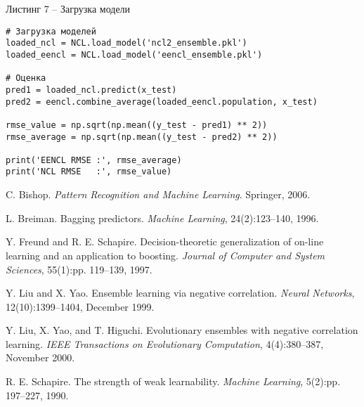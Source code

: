 \documentclass[12pt]{extarticle}
\begin{document}
\newpage

Листинг 7 -- Загрузка модели

\begin{lstlisting}
# Загрузка моделей
loaded_ncl = NCL.load_model('ncl2_ensemble.pkl')
loaded_eencl = NCL.load_model('eencl_ensemble.pkl')

# Оценка
pred1 = loaded_ncl.predict(x_test)
pred2 = eencl.combine_average(loaded_eencl.population, x_test)

rmse_value = np.sqrt(np.mean((y_test - pred1) ** 2))
rmse_average = np.sqrt(np.mean((y_test - pred2) ** 2))

print('EENCL RMSE :', rmse_average)
print('NCL RMSE   :', rmse_value)
\end{lstlisting}

\newpage %

\begin{thebibliography}{9}
C. Bishop. \textit{Pattern Recognition and Machine Learning}. Springer, 2006.

L. Breiman. Bagging predictors. \textit{Machine Learning}, 24(2):123–140, 1996.

Y. Freund and R. E. Schapire. Decision-theoretic generalization of on-line learning and an application to boosting. \textit{Journal of Computer and System Sciences}, 55(1):pp. 119–139, 1997.

Y. Liu and X. Yao. Ensemble learning via negative correlation. \textit{Neural Networks}, 12(10):1399–1404, December 1999.

Y. Liu, X. Yao, and T. Higuchi. Evolutionary ensembles with negative correlation learning. \textit{IEEE Transactions on Evolutionary Computation}, 4(4):380–387, November 2000.

R. E. Schapire. The strength of weak learnability. \textit{Machine Learning}, 5(2):pp. 197–227, 1990.
\end{thebibliography}
\end{document}
